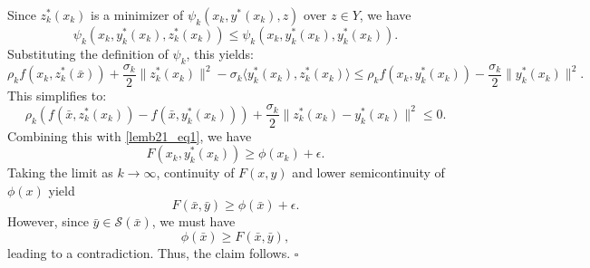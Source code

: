 \documentclass{article}
\newenvironment{proof}[1][Proof]{\par
	\normalfont\topsep6pt\relax
	\trivlist\item[\hskip\labelsep\itshape #1.]\ignorespaces
}{%
	\hfill\ensuremath{\square}\endtrivlist
}
\begin{document}
\begin{proof}
    Since $z_k^*(x_k)$ is a minimizer of $\psi_{k}(x_k, y^*(x_k), z)$ over $z \in Y$, we have 
    \[
    \psi_k (x_k,y_k^*(x_k), z_k^*(x_k)) \le \psi_k (x_k,y_k^*(x_k), y_k^*(x_k)).
    \]
Substituting the definition of $\psi_k$, this yields:
    \[
 \rho_k f(x_k, z_k^*(\bar{x}) ) + \frac{\sigma_k}{2}\| z_k^*(x_k) \|^2 - \sigma_k \langle y_k^*(x_k) , z_k^*(x_k) \rangle \le  \rho_k f(x_k, y_k^*(x_k)  ) - \frac{\sigma_k}{2}\| y_k^*(x_k) \|^2.
    \]
This simplifies to:
    \[
    \rho_k \left( f(\bar{x}, z_k^*(x_k) )  - f(\bar{x}, y_k^*(x_k)  )  \right) + \frac{\sigma_k}{2}\|z_k^*(x_k) - y_k^*(x_k)\|^2 \le 0.
    \]
Combining this with \eqref{lemb21_eq1}, we have
\[
    F(x_k, y_k^*(x_k) ) \ge \phi(x_k) + \epsilon.
    \]
    Taking the limit as $k \rightarrow \infty$, continuity of $F(x,y)$ and lower semicontinuity of $\phi(x)$ yield
    \[
     F(\bar{x}, \bar{y}) \ge \phi(\bar{x}) + \epsilon.
    \]
    However, since $\bar{y} \in \mathcal{S}(\bar{x})$, we must have
    \[
    \phi(\bar{x}) \ge F(\bar{x}, \bar{y}),
    \]
leading to a contradiction. Thus, the claim follows.
	 \end{proof}
\end{document}
